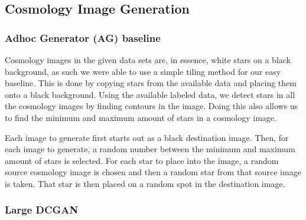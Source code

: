 \documentclass[10pt,conference,compsocconf]{IEEEtran}
\begin{document}



\subsection{Cosmology Image Generation}

\subsubsection{Adhoc Generator (AG) baseline} %
Cosmology images in the given data sets are, in essence, white stars on a black background, as such we were able to use a simple tiling method for our easy baseline. This is done by copying stars from the available data and placing them onto a black background. Using the available labeled data, we detect stars in all the cosmology images by finding contours in the image. Doing this also allows us to find the minimum and maximum amount of stars in a cosmology image.

Each image to generate first starts out as a black destination image. Then, for each image to generate, a random number between the minimum and maximum amount of stars is selected. For each star to place into the image, a random source cosmology image is chosen and then a random star from that source image is taken. That star is then placed on a random spot in the destination image.

\subsubsection{Large DCGAN}
\end{document}
